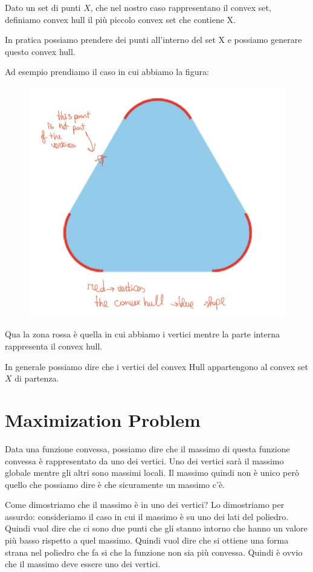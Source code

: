 \documentclass[14pt]{extreport}
\begin{document}
Dato un set di punti $X$, che nel nostro caso rappresentano il convex set, definiamo convex hull il più piccolo convex set che contiene X.

In pratica possiamo prendere dei punti all'interno del set X e possiamo generare questo convex hull.

Ad esempio prendiamo il caso in cui abbiamo la figura:

\begin{figure}[H]
	\centering
	\includegraphics[width=0.7\linewidth]{230.jpeg}
\end{figure}

Qua la zona rossa è quella in cui abbiamo i vertici mentre la parte interna rappresenta il convex hull.

In generale possiamo dire che i vertici del convex Hull appartengono al convex set $X$ di partenza.

\section{Maximization Problem}

Data una funzione convessa, possiamo dire che il massimo di questa funzione convessa è rappresentato da uno dei vertici. Uno dei vertici sarà il
massimo globale mentre gli altri sono massimi locali. Il massimo quindi non è unico però quello che possiamo dire è che sicuramente un massimo c'è.

Come dimostriamo che il massimo è in uno dei vertici? Lo dimostriamo per assurdo: consideriamo il caso in cui il massimo è su uno dei lati del
poliedro. Quindi vuol dire che ci sono due punti che gli stanno intorno che hanno un valore più basso rispetto a quel massimo. Quindi vuol dire che si
ottiene una forma strana nel poliedro che fa si che la funzione non sia più convessa. Quindi è ovvio che il massimo deve essere uno dei vertici.
\end{document}
